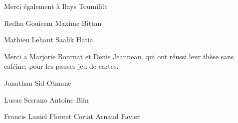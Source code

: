 Merci également à Ilays Toumililt



Redha Gouicem
Maxime Bittan

Mathieu Lehaut
Saalik Hatia


Merci a Marjorie Bournat et Denis Jeanneau, qui ont réussi leur thèse sans caféine, 
pour les pauses jeu de cartes.


Jonathan Sid-Otmane

Lucas Serrano
Antoine Blin

Francis Laniel
Florent Coriat
Arnaud Favier









%
%
%
%
%
%
%
%
%
